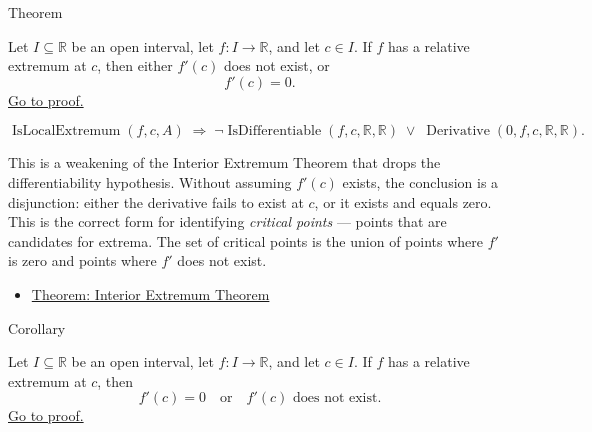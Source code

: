 
\begin{theorembox}{Theorem}
\begin{theorem}
\label{thm:necessary-condition-extremum}
Let $I \subseteq \mathbb{R}$ be an open interval, let $f : I \to \mathbb{R}$, and let $c \in I$. If $f$ has a relative extremum at $c$, then either $f'(c)$ does not exist, or
\[
f'(c) = 0.
\]
\hyperref[prf:necessary-condition-extremum]{Go to proof.}
\end{theorem}
\end{theorembox}

\begin{remark*}
\[
\operatorname{IsLocalExtremum}(f,c,A)
\;\Rightarrow\;
\lnot\operatorname{IsDifferentiable}(f,c,\mathbb{R},\mathbb{R}) \;\lor\; \operatorname{Derivative}(0,f,c,\mathbb{R},\mathbb{R}).
\]
\end{remark*}

\begin{remark*}[Interpretation]
This is a weakening of the Interior Extremum Theorem that drops the differentiability hypothesis. Without assuming $f'(c)$ exists, the conclusion is a disjunction: either the derivative fails to exist at $c$, or it exists and equals zero. This is the correct form for identifying \emph{critical points} --- points that are candidates for extrema. The set of critical points is the union of points where $f'$ is zero and points where $f'$ does not exist.
\end{remark*}

\begin{dependencies}
\begin{itemize}
  \item \hyperref[thm:interior-extremum-theorem]{Theorem: Interior Extremum Theorem}
\end{itemize}
\end{dependencies}


\begin{corollarybox}{Corollary}
\begin{corollary}
\label{cor:relative-extremum-necessary-condition}
Let $I \subseteq \mathbb{R}$ be an open interval, let $f : I \to \mathbb{R}$, and let $c \in I$. If $f$ has a relative extremum at $c$, then
\[
f'(c) = 0 \quad \text{or} \quad f'(c) \text{ does not exist.}
\]
\hyperref[prf:relative-extremum-necessary-condition]{Go to proof.}
\end{corollary}
\end{corollarybox}

